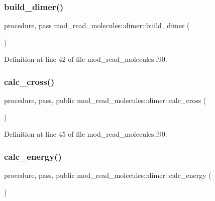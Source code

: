 \subsubsection{\texorpdfstring{build\+\_\+dimer()}{build\_dimer()}}
{\footnotesize\ttfamily procedure, pass mod\+\_\+read\+\_\+molecules\+::dimer\+::build\+\_\+dimer (\begin{DoxyParamCaption}{ }\end{DoxyParamCaption})}



Definition at line 42 of file mod\+\_\+read\+\_\+molecules.\+f90.

\mbox{\label{structmod__read__molecules_1_1dimer_ac68d610d7189a3e9306fc74d3c12afa3}} 
\subsubsection{\texorpdfstring{calc\+\_\+cross()}{calc\_cross()}}
{\footnotesize\ttfamily procedure, pass, public mod\+\_\+read\+\_\+molecules\+::dimer\+::calc\+\_\+cross (\begin{DoxyParamCaption}{ }\end{DoxyParamCaption})}



Definition at line 45 of file mod\+\_\+read\+\_\+molecules.\+f90.

\mbox{\label{structmod__read__molecules_1_1dimer_a6fb49cd36be96c4e3ce6ebac70e2db74}} 
\subsubsection{\texorpdfstring{calc\+\_\+energy()}{calc\_energy()}}
{\footnotesize\ttfamily procedure, pass, public mod\+\_\+read\+\_\+molecules\+::dimer\+::calc\+\_\+energy (\begin{DoxyParamCaption}{ }\end{DoxyParamCaption})}



